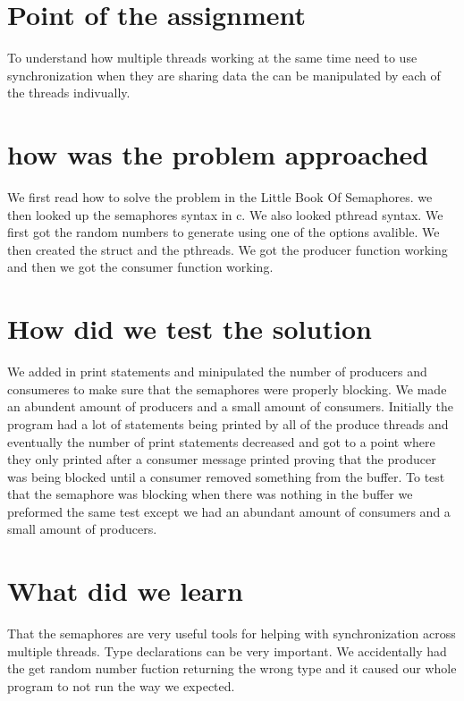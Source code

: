 \documentclass[letterpaper,10pt,titlepage]{article}
\begin{document}
\section{Point of the assignment}
To understand how multiple threads working at the same time need to use
synchronization when they are sharing data the can be manipulated by each of
the threads indivually.

\section{how was the problem approached}
We first read how to solve the problem in the Little Book Of Semaphores. we 
then looked up the semaphores syntax in c. We also looked pthread syntax. We 
first got the random numbers to generate using one of the options avalible. 
We then created the struct and the pthreads. We got the producer function 
working and then we got the consumer function working.

\section{How did we test the solution}
We added in print statements and minipulated the number of producers and 
consumeres to make sure that the semaphores were properly blocking. We 
made an abundent amount of producers and a small amount of consumers. Initially 
the program had a lot of statements being printed by all of the produce threads 
and eventually the number of print statements decreased and got to a point where 
they only printed after a consumer message printed proving that the producer 
was being blocked until a consumer removed something from the buffer. To test 
that the semaphore was blocking when there was nothing in the buffer we 
preformed the same test except we had an abundant amount of consumers and a 
small amount of producers. 

\section{What did we learn}
That the semaphores are very useful tools for helping with synchronization 
across multiple threads. Type declarations can be very important. We 
accidentally had the get random number fuction returning the wrong type and 
it caused our whole program to not run the way we expected. 

%
\end{document}
